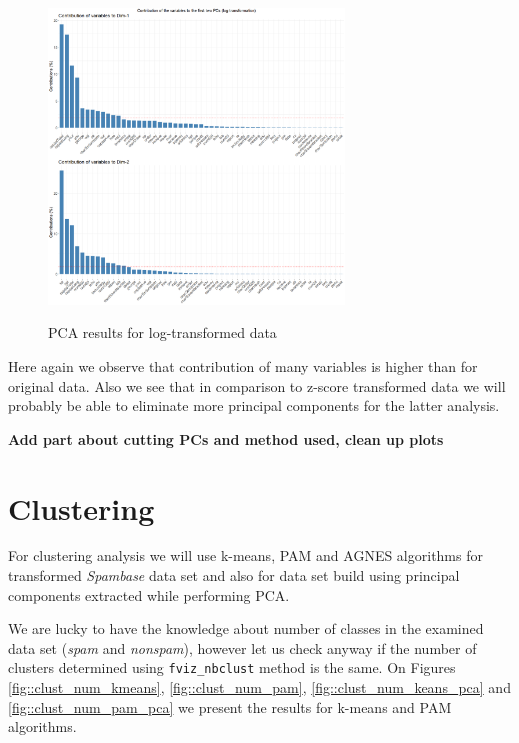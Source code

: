 \documentclass{article}
\begin{document}
	\begin{figure}[h]
		\caption{PCA results for log-transformed data}
		\centering
		\includegraphics[width=0.7\textwidth]{"proj2_plots/varplot3.png"}
		\label{fig::varplot_log}
	\end{figure}
	
	Here again we observe that contribution of many variables is higher than for original data. Also we see that in comparison to z-score transformed data we will probably be able to eliminate more principal components for the latter analysis.
	
	\textbf{Add part about cutting PCs and method used, clean up plots}
	
	\section{Clustering}
	For clustering analysis we will use k-means, PAM and AGNES algorithms for transformed \textit{Spambase} data set and also for data set build using principal components extracted while performing PCA. 
	
	We are lucky to have the knowledge about number of classes in the examined data set (\textit{spam} and \textit{nonspam}), however let us check anyway if the number of clusters determined using \texttt{fviz\_nbclust} method is the same. On Figures \ref{fig::clust_num_kmeans},
	\ref{fig::clust_num_pam}, \ref{fig::clust_num_keans_pca} and \ref{fig::clust_num_pam_pca} we present the results for k-means and PAM algorithms.
	
\end{document}
